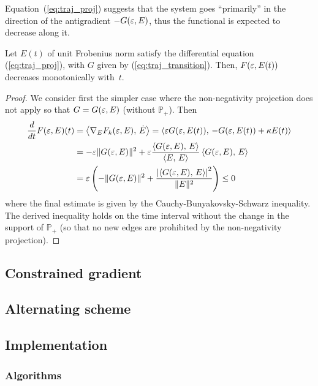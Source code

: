   Equation~(\ref{eq:traj_proj}) suggests that the system goes ``primarily'' in the direction of the antigradient $-G(\varepsilon,E)$, thus the functional is expected to decrease along it.
  \begin{lemma}[Monotonicity]
  Let $E(t)$ of unit Frobenius norm satisfy the differential equation (\ref{eq:traj_proj}), with $G$ given by (\ref{eq:traj_transition}). Then, 
  $F(\varepsilon, E(t))$ decreases monotonically with~$t$.
  \end{lemma}
  \begin{proof}
  We consider first the simpler case where the non-negativity projection does not apply so that $G=G(\varepsilon,E)$ (without $\mathbb{P}_+$). Then
  \begin{equation}\label{eq:mono}
      \begin{aligned} 
    \frac{d}{dt} F(\varepsilon, E)(t) & =\left\langle {  \nabla_{E} F_k(\varepsilon, E), \, \dot{E} } \right\rangle=\left\langle { \varepsilon G( \varepsilon, E(t) ) ,\, -G( \varepsilon, E(t) )+\kappa E(t) } \right\rangle \\ 
    & = -\varepsilon \lVert G( \varepsilon, E ) \rVert^2 + \varepsilon\frac{\left\langle {G( \varepsilon, E ),\, E } \right\rangle}{\left\langle {E, \, E} \right\rangle} \left\langle {G( \varepsilon, E ),\, E } \right\rangle  \\
    & = \varepsilon \left(  -\lVert G( \varepsilon, E ) \rVert^2 + \frac{\left| \left\langle {G( \varepsilon, E ),\, E } \right\rangle \right|^2}{\lVert E \rVert^2} \right) \le 0 
  \end{aligned}
  \end{equation}
  where the final estimate is given by the Cauchy-Bunyakovsky-Schwarz inequality. The derived inequality holds on the time interval without the change in the support of $\mathbb P_+$ (so that no new edges are prohibited by the non-negativity projection).
  \end{proof}
  

\subsection{ Constrained gradient }


\subsection{ Alternating scheme }


\subsection{ Implementation }

\subsubsection{ Algorithms }

